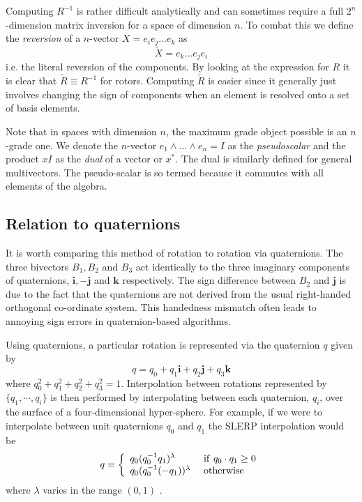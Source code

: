 Computing $R^{-1}$ is rather difficult analytically and can sometimes
require a full $2^n$-dimension matrix inversion for a space of
dimension $n$. To combat this we define
the \emph{reversion} of a $n$-vector $X = e_ie_j...e_k$ as
\[
\tilde{X} = e_k...e_je_i
\]
i.e. the literal reversion of the components. By looking at the expression for
$R$ it is clear that $\tilde{R} \equiv R^{-1}$ for rotors. Computing
$\tilde{R}$ is easier since it generally just involves changing the sign of
components when an element is resolved onto a set of basis elements.

Note that in spaces with dimension $n$, the maximum grade object possible is
an $n$-grade one. We denote the $n$-vector $e_1 \wedge ... \wedge e_n = I$ as
the \emph{pseudoscalar} and the product $xI$ as the \emph{dual} of a vector or
$x^*$. The dual is similarly defined for general multivectors. The
pseudo-scalar is so termed because it commutes with all elements of the
algebra.

\subsection{Relation to quaternions}
\label{sec:quaternions}

It is worth comparing this method of rotation to rotation via
quaternions. The three bivectors $B_1,B_2$ and $B_3$ act identically to the
three imaginary components of quaternions, $\mathbf{i}, -\mathbf{j}$ and
$\mathbf{k}$ respectively. The sign difference between $B_2$ and $\mathbf{j}$
is due to the fact that the quaternions are not derived from the usual
right-handed orthogonal co-ordinate system. This handedness mismatch often
leads to annoying sign errors in quaternion-based algorithms.

Using quaternions, a particular rotation is represented via the quaternion 
$q$ given by
\[
q = q_0 + q_1 \mathbf{i} + q_2 \mathbf{j} + q_3 \mathbf{k}
\]
where $q_0^2 + q_1^2 + q_2^2 + q_3^2 = 1$. Interpolation between rotations 
represented
by $\{ q_1, \cdots, q_i \}$ is then performed by interpolating between
each quaternion, $q_i$,
over the surface of a four-dimensional hyper-sphere. For example, if we 
were to interpolate
between unit quaternions $q_0$ and $q_1$ the SLERP interpolation would be
\[
q = \left\{
\begin{array}{ll}
q_0(q_0^{-1}q_1)^\lambda & {\rm ~if~} q_0 \cdot q_1 \ge 0 \\
q_0(q_0^{-1}(-q_1))^\lambda & {\rm ~otherwise}
\end{array}
\right.
\]
where $\lambda$ varies in the range $(0,1)$ \cite{slerp}.

